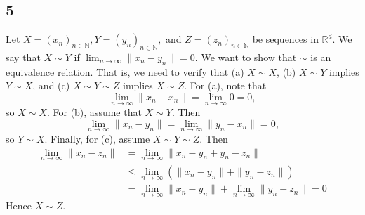 \documentclass[11pt]{amsart}
\begin{document}
\subsection*{5} Let $X = (x_{n})_{n\in\mathbb{N}}, Y = (y_{n})_{n\in\mathbb{N}},$ and $Z = (z_{n})_{n\in\mathbb{N}}$ be sequences in $\mathbb{R}^{d}$. We say that $X\sim Y$ if $\lim_{n\rightarrow \infty}\|x_{n} - y_{n}\| = 0$. We want to show that $\sim$ is an equivalence relation. That is, we need to verify that (a) $X\sim X$, (b) $X\sim Y$ implies $Y\sim X$, and (c) $X\sim Y\sim Z$ implies $X\sim Z$. For (a), note that 
\[ \lim_{n\rightarrow \infty}\|x_{n} - x_{n}\| = \lim_{n\rightarrow\infty} 0 = 0,\]
so $X \sim X$. For (b), assume that $X\sim Y$. Then
\[ \lim_{n\rightarrow \infty}\|x_{n} - y_{n}\| = \lim_{n\rightarrow \infty}\|y_{n} - x_{n}\| = 0,\]
so $Y\sim X$. Finally, for (c), assume $X\sim Y\sim Z$. Then 
\begin{align*}
  \lim_{n\rightarrow\infty}\|x_{n} - z_{n}\| & = \lim_{n\rightarrow\infty}\|x_{n} - y_{n} + y_{n} - z_{n}\| \\
  & \leq \lim_{n\rightarrow \infty}\left(\|x_{n} - y_{n}\| + \|y_{n} - z_{n}\|\right) \\
  & = \lim_{n\rightarrow\infty}\|x_{n} - y_{n}\| + \lim_{n\rightarrow\infty}\|y_{n} - z_{n}\| = 0
\end{align*}
Hence $X\sim Z$.
\end{document}
